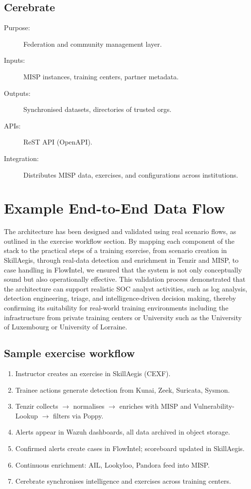 \documentclass[10pt,a4paper]{report}
\begin{document}
\subsection{Cerebrate}
\begin{description}
  \item[Purpose:] Federation and community management layer.
  \item[Inputs:] MISP instances, training centers, partner metadata.
  \item[Outputs:] Synchronised datasets, directories of trusted orgs.
  \item[APIs:] ReST API (OpenAPI).
  \item[Integration:] Distributes MISP data, exercises, and configurations
  across institutions.
\end{description}

\section{Example End-to-End Data Flow}
The architecture has been designed and validated using real scenario flows,
as outlined in the exercise workflow section. By mapping each component of
the stack to the practical steps of a training exercise, from scenario
creation in SkillAegis, through real-data detection and enrichment in Tenzir
and MISP, to case handling in FlowIntel, we ensured that the system is not
only conceptually sound but also operationally effective. This validation
process demonstrated that the architecture can support realistic SOC analyst
activities, such as log analysis, detection engineering, triage, and
intelligence-driven decision making, thereby confirming its suitability for
real-world training environments including the infrastructure from private
training centers or University such as the University of Luxembourg or
University of Lorraine.

\subsection{Sample exercise workflow}

\begin{enumerate}
    \item Instructor creates an exercise in SkillAegis (CEXF).
    \item Trainee actions generate detection from Kunai, Zeek, Suricata,
          Sysmon.
    \item Tenzir collects $\to$ normalises $\to$ enriches with MISP and
          Vulnerability-Lookup $\to$ filters via Poppy.
    \item Alerts appear in Wazuh dashboards, all data archived in object storage.
    \item Confirmed alerts create cases in FlowIntel; scoreboard updated in
          SkillAegis.
    \item Continuous enrichment: AIL, Lookyloo, Pandora feed into MISP.
    \item Cerebrate synchronises intelligence and exercises across training
          centers.
\end{enumerate}
\end{document}
